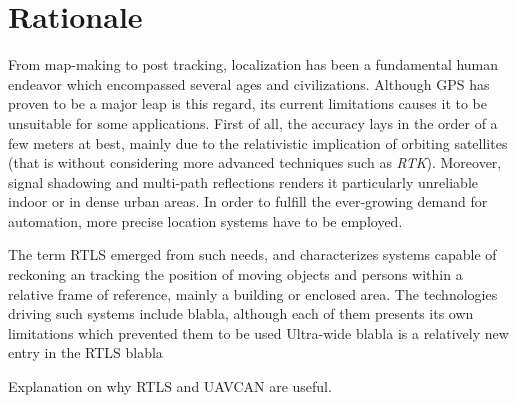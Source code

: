\section{Rationale}

From map-making to post tracking, localization has been a fundamental human endeavor which encompassed several ages and civilizations.
Although GPS has proven to be a major leap is this regard, its current limitations causes it to be unsuitable for some applications.
First of all, the accuracy lays in the order of a few meters at best, mainly due to the relativistic implication of orbiting satellites \cite{gps1} (that is without considering more advanced techniques such as \emph{RTK}).
Moreover, signal shadowing and multi-path reflections renders it particularly unreliable indoor or in dense urban areas.
In order to fulfill the ever-growing demand for automation, more precise location systems have to be employed.

The term RTLS emerged from such needs, and characterizes systems capable of reckoning an tracking the position of moving objects and persons within a relative frame of reference, mainly a building or enclosed area.
The technologies driving such systems include blabla, although each of them presents its own limitations which prevented them to be used
Ultra-wide blabla is a relatively new entry in the RTLS blabla


Explanation on why RTLS and UAVCAN are useful.
